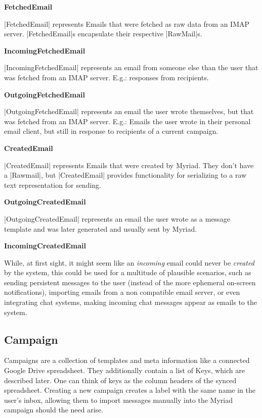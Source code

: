 \textbf{FetchedEmail}

|FetchedEmail| represents Emails that were fetched as raw data from an IMAP server. |FetchedEmail|s encapsulate their respective |RawMail|s.

\textbf{IncomingFetchedEmail}

|IncomingFetchedEmail| represents an email from someone else than the user that was fetched from an IMAP server. E.g.: responses from recipients.

\textbf{OutgoingFetchedEmail}

|OutgoingFetchedEmail| represents an email the user wrote themselves, but that was fetched from an IMAP server. E.g.: Emails the user wrote in their personal email client, but still in response to recipients of a current campaign.

\textbf{CreatedEmail}

|CreatedEmail| represents Emails that were created by Myriad. They don't have a |Rawmail|, but |CreatedEmail| provides functionality for serializing to a raw text representation for sending.

\textbf{OutgoingCreatedEmail}

|OutgoingCreatedEmail| represents an email the user wrote as a message template and was later generated and usually sent by Myriad.

\textbf{IncomingCreatedEmail}

While, at first sight, it might seem like an \emph{incoming} email could never be \emph{created} by the system, this could be used for a multitude of plausible scenarios, such as sending persistent messages to the user (instead of the more ephemeral on-screen notifications), importing emails from a non  compatible email server, or even integrating chat systems, making incoming chat messages appear as emails to the system.

\subsection{Campaign}

Campaigns are a collection of templates and meta information like a connected Google Drive spreadsheet. They additionally contain a list of Keys, which are described later. One can think of keys as the column headers of the synced spreadsheet. Creating a new campaign creates a label with the same name in the user's inbox, allowing them to import messages manually into the Myriad campaign should the need arise.

